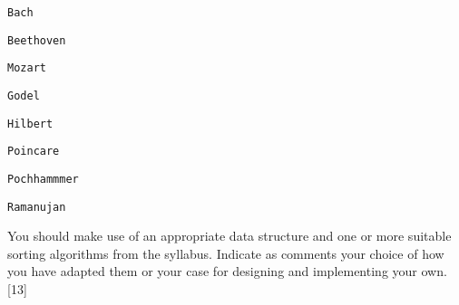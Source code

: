 \noindent %
\noindent\begin{minipage}[t]{1\columnwidth}%
\texttt{Bach }

\texttt{Beethoven }

\texttt{Mozart }

\texttt{Godel }

\texttt{Hilbert }

\texttt{Poincare }

\texttt{Pochhammmer}

\texttt{Ramanujan }%
\end{minipage}

You should make use of an appropriate data structure and one or more
suitable sorting algorithms from the syllabus. Indicate as comments
your choice of how you have adapted them or your case for designing
and implementing your own. \hfill{}{[}13{]}